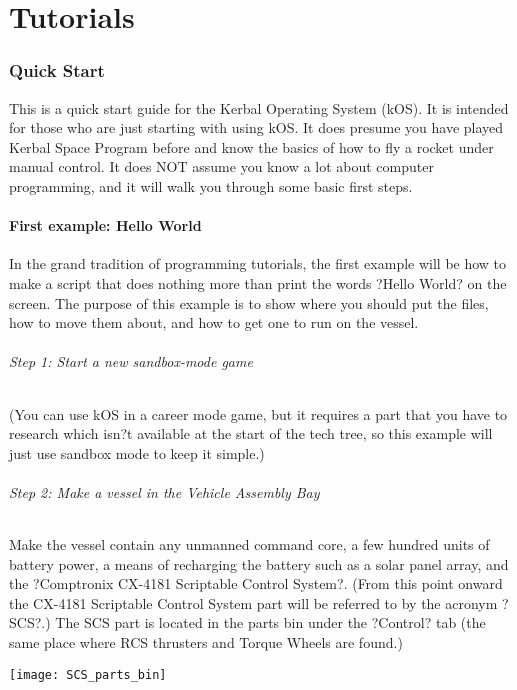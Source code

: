 \part{Tutorials}
	\section{Quick Start}
		This is a quick start guide for the Kerbal Operating System (kOS). It is intended for those who are just starting with using kOS. It does presume you have played Kerbal Space Program before and know the basics of how to fly a rocket under manual control. It does NOT assume you know a lot about computer programming, and it will walk you through some basic first steps.
		\subsection{First example: Hello World}
In the grand tradition of programming tutorials, the first example will be how to make a script that does nothing more than print the words ?Hello World? on the screen. The purpose of this example is to show where you should put the files, how to move them about, and how to get one to run on the vessel.

\paragraph{Step 1: Start a new sandbox-mode game}
(You can use kOS in a career mode game, but it requires a part that you have to research which isn?t available at the start of the tech tree, so this example will just use sandbox mode to keep it simple.)

\paragraph{Step 2: Make a vessel in the Vehicle Assembly Bay}
Make the vessel contain any unmanned command core, a few hundred units of battery power, a means of recharging the battery such as a solar panel array, and the ?Comptronix CX-4181 Scriptable Control System?. (From this point onward the CX-4181 Scriptable Control System part will be referred to by the acronym ?SCS?.) The SCS part is located in the parts bin under the ?Control? tab (the same place where RCS thrusters and Torque Wheels are found.)

\begin{center}
\texttt{[image: SCS\_parts\_bin]}
\end{center}

